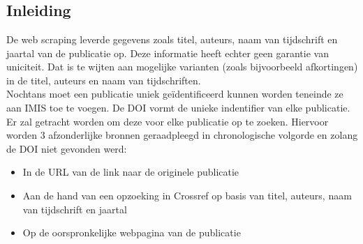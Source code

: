 
\chapter{}%
\label{ch:linked_data}

\section{Inleiding}
De web scraping leverde gegevens zoals titel, auteurs, naam van tijdschrift en jaartal van de publicatie op. Deze informatie heeft echter geen garantie van uniciteit. Dat is te wijten aan mogelijke varianten (zoals bijvoorbeeld afkortingen) in de titel, auteurs en naam van tijdschriften.\\
Nochtans moet een publicatie uniek geïdentificeerd kunnen worden teneinde ze aan IMIS toe te voegen.
De DOI vormt de unieke indentifier van elke publicatie. Er zal getracht worden om deze voor elke publicatie op te zoeken. Hiervoor worden 3 afzonderlijke bronnen geraadpleegd in chronologische volgorde en zolang de DOI niet gevonden werd:
\begin{itemize}
    \item In de URL van de link naar de originele publicatie
    \item Aan de hand van een opzoeking in Crossref op basis van titel, auteurs, naam van tijdschrift en jaartal
    \item Op de oorspronkelijke webpagina van de publicatie
\end{itemize}

